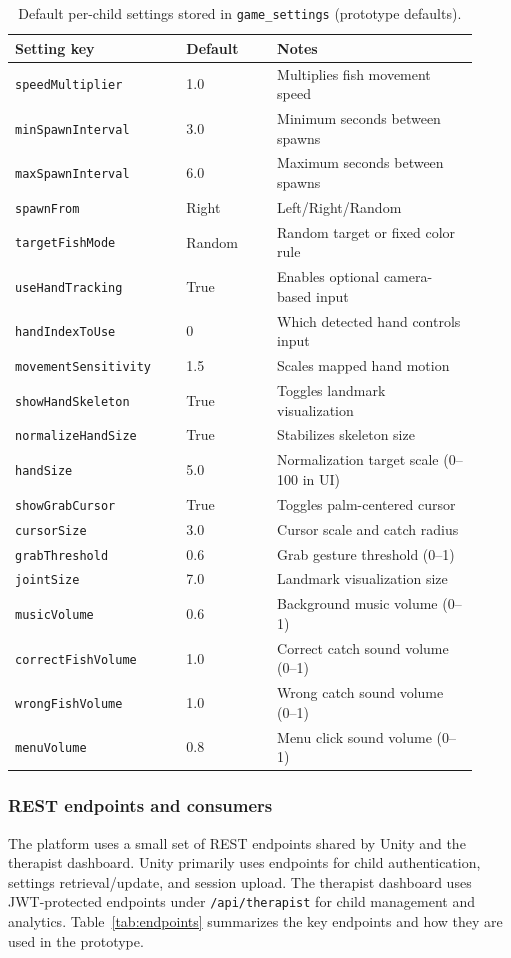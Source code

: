 \documentclass[12pt]{article}
\begin{document}
\begin{table}[H]
\centering
\caption{Default per-child settings stored in \texttt{game\_settings} (prototype defaults).}
\label{tab:default_settings}
\begin{tabular}{p{0.34\linewidth} p{0.18\linewidth} p{0.40\linewidth}}
\toprule
\textbf{Setting key} & \textbf{Default} & \textbf{Notes} \\
\midrule
\texttt{speedMultiplier} & 1.0 & Multiplies fish movement speed \\
\texttt{minSpawnInterval} & 3.0 & Minimum seconds between spawns \\
\texttt{maxSpawnInterval} & 6.0 & Maximum seconds between spawns \\
\texttt{spawnFrom} & Right & Left/Right/Random \\
\texttt{targetFishMode} & Random & Random target or fixed color rule \\
\texttt{useHandTracking} & True & Enables optional camera-based input \\
\texttt{handIndexToUse} & 0 & Which detected hand controls input \\
\texttt{movementSensitivity} & 1.5 & Scales mapped hand motion \\
\texttt{showHandSkeleton} & True & Toggles landmark visualization \\
\texttt{normalizeHandSize} & True & Stabilizes skeleton size \\
\texttt{handSize} & 5.0 & Normalization target scale (0--100 in UI) \\
\texttt{showGrabCursor} & True & Toggles palm-centered cursor \\
\texttt{cursorSize} & 3.0 & Cursor scale and catch radius \\
\texttt{grabThreshold} & 0.6 & Grab gesture threshold (0--1) \\
\texttt{jointSize} & 7.0 & Landmark visualization size \\
\texttt{musicVolume} & 0.6 & Background music volume (0--1) \\
\texttt{correctFishVolume} & 1.0 & Correct catch sound volume (0--1) \\
\texttt{wrongFishVolume} & 1.0 & Wrong catch sound volume (0--1) \\
\texttt{menuVolume} & 0.8 & Menu click sound volume (0--1) \\
\bottomrule
\end{tabular}
\end{table}

\subsubsection*{REST endpoints and consumers}
The platform uses a small set of REST endpoints shared by Unity and the therapist dashboard. Unity primarily uses endpoints for child authentication, settings retrieval/update, and session upload. The therapist dashboard uses JWT-protected endpoints under \texttt{/api/therapist} for child management and analytics. Table~\ref{tab:endpoints} summarizes the key endpoints and how they are used in the prototype.
\end{document}
